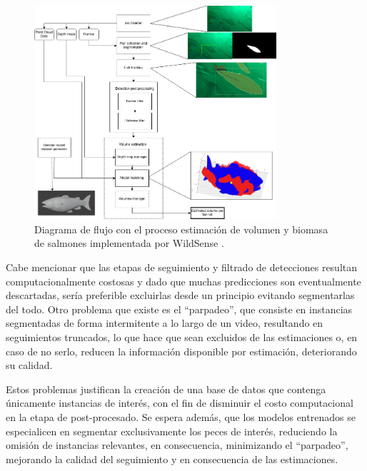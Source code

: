 \begin{figure}[tb]
\begin{center}
    \includegraphics[width=0.8\textwidth]{figures/workflow_wildsense.png}
    \caption[Flujo de trabajo implementado por WildSense para estimación de masa y volumen en peces]{Diagrama de flujo con el proceso estimación de volumen y biomasa de salmones implementada por WildSense \cite{wildsense-2}.}
    \label{fig:workflow_wildsense}
\end{center}
\end{figure}

Cabe mencionar que las etapas de seguimiento y filtrado de detecciones resultan computacionalmente costosas y dado que muchas predicciones son eventualmente descartadas, sería preferible excluirlas desde un principio evitando segmentarlas del todo. Otro problema que existe es el “parpadeo”, que consiste en instancias segmentadas de forma intermitente a lo largo de un video, resultando en seguimientos truncados, lo que hace que sean excluidos de las estimaciones o, en caso de no serlo, reducen la información disponible por estimación, deteriorando su calidad.

Estos problemas justifican la creación de una base de datos que contenga únicamente instancias de interés, con el fin de disminuir el costo computacional en la etapa de post-procesado. Se espera además, que los modelos entrenados se especialicen en segmentar exclusivamente los peces de interés, reduciendo la omisión de instancias relevantes, en consecuencia, minimizando el “parpadeo”, mejorando la calidad del seguimiento y en consecuencia de las estimaciones.